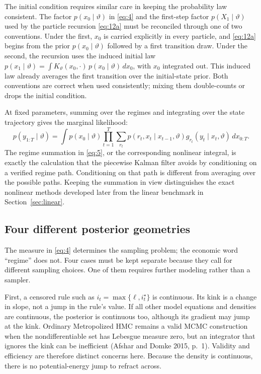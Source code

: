 \documentclass[11pt]{article}
\begin{document}
The initial condition requires similar care in keeping the probability law consistent. The factor \(p(x_0\mid\vartheta)\) in \eqref{eq:4} and the first-step factor \(p(X_1\mid\vartheta)\) used by the particle recursion \eqref{eq:12a} must be reconciled through one of two conventions. Under the first, \(x_0\) is carried explicitly in every particle, and \eqref{eq:12a} begins from the prior \(p(x_0\mid\vartheta)\) followed by a first transition draw. Under the second, the recursion uses the induced initial law \(p(x_1\mid\vartheta)=\int K_\vartheta(x_0,\cdot)\,
p(x_0\mid\vartheta)\,dx_0\), with \(x_0\) integrated out. This induced law already averages the first transition over the initial-state prior. Both conventions are correct when used consistently; mixing them double-counts or drops the initial condition.

At fixed parameters, summing over the regimes and integrating over the state trajectory gives the marginal likelihood:
\begin{equation}\label{eq:5}
 p(y_{1:T}\mid\vartheta)=
 \int p(x_0\mid\vartheta)
 \prod_{t=1}^T\sum_{r_t}p(r_t,x_t\mid x_{t-1},\vartheta)
 g_{r_t}(y_t\mid x_t,\vartheta)\,dx_{0:T}.
\end{equation}
The regime summation in \eqref{eq:5}, or the corresponding nonlinear integral, is exactly the calculation that the piecewise Kalman filter avoids by conditioning on a verified regime path. Conditioning on that path is different from averaging over the possible paths. Keeping the summation in view distinguishes the exact nonlinear methods developed later from the linear benchmark in Section~\ref{sec:linear}.

\subsection{Four different posterior geometries}\label{sec:geometries}

The measure in \eqref{eq:4} determines the sampling problem; the economic word ``regime'' does not. Four cases must be kept separate because they call for different sampling choices. One of them requires further modeling rather than a sampler.

First, a censored rule such as \(i_t=\max\{\ell,i_t^\star\}\) is continuous. Its kink is a change in slope, not a jump in the rule's value. If all other model equations and densities are continuous, the posterior is continuous too, although its gradient may jump at the kink. Ordinary Metropolized HMC remains a valid MCMC construction when the nondifferentiable set has Lebesgue measure zero, but an integrator that ignores the kink can be inefficient (Afshar and Domke 2015, p.~1). Validity and efficiency are therefore distinct concerns here. Because the density is continuous, there is no potential-energy jump to refract across.
\end{document}
